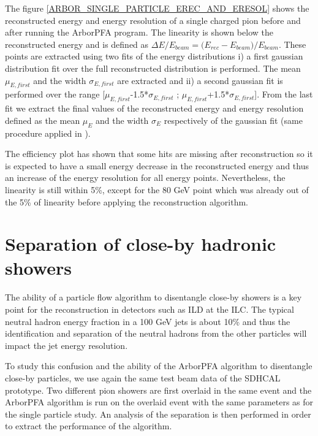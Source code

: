 \documentclass[cits]{JINST}
\begin{document}
The figure \ref{ARBOR_SINGLE_PARTICLE_EREC_AND_ERESOL} shows the reconstructed energy and energy resolution of a single charged pion before and after running the ArborPFA program. The linearity is shown below the reconstructed energy and is defined as $\Delta E/E_{beam} = \Big(E_{rec} - E_{beam}\Big)/E_{beam}$. These points are extracted using two fits of the energy distributions i) a first gaussian distribution fit over the full reconstructed distribution is performed. The mean $\mu_{E,first}$ and the width $\sigma_{E,first}$ are extracted and ii) a second gaussian fit is performed over the range [$\mu_{E,first}$-1.5*$\sigma_{E,first}$ ; $\mu_{E,first}$+1.5*$\sigma_{E,first}$]. From the last fit we extract the final values of the reconstructed energy and energy resolution defined as the mean $\mu_E$ and the width $\sigma_E$ respectively of the gaussian fit (same procedure applied in \cite{sdhcal-paper}).

The efficiency plot has shown that some hits are missing after reconstruction so it is expected to have a small energy decrease in the reconstructed energy and thus an increase of the energy resolution for all energy points. Nevertheless, the linearity is still within 5\%, except for the 80 GeV point which was already out of the 5\% of linearity before applying the reconstruction algorithm.

\newpage
\section{Separation of close-by hadronic showers}

The ability of a particle flow algorithm to disentangle close-by showers is a key point for the reconstruction in detectors such as ILD at the ILC. The typical neutral hadron energy fraction in a 100 GeV jets is about 10\% and thus the identification and separation of the neutral hadrons from the other particles will impact the jet energy resolution.

To study this confusion and the ability of the ArborPFA algorithm to disentangle close-by particles, we use again the same test beam data of the SDHCAL prototype. Two different pion showers are first overlaid in the same event and the ArborPFA algorithm is run on the overlaid event with the same parameters as for the single particle study. An analysis of the separation is then performed in order to extract the performance of the algorithm.
\end{document}
